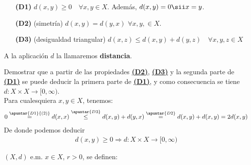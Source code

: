 \begin{ejemplo}
    \begin{enumerate}
        \item [\textbf{(\hypertarget{D1}{D1})}] $d(x, y) \geq 0$\ \ $\forall x,y \in X$. Además, $d(x,y)= 0 \sii x=y$.
        \item [\textbf{(\hypertarget{D2}{D2})}] (simetría) $d(x,y)=d(y,x)$ $\forall x, y, \in X.$
        \item [\textbf{(\hypertarget{D3}{D3})}] (desigualdad triangular) $d(x,z) \leq d(x,y) + d(y,z)$\ \ $\forall x,y,z \in X$
    \end{enumerate}

    A la aplicación $d$ la llamaremos \textbf{distancia}.

    \begin{ejercicio}
        Demostrar que a partir de las propiedades \hyperlink{D2}{\textbf{(D2)}}, \hyperlink{D3}{\textbf{(D3)}} y la segunda parte de \hyperlink{D1}{\textbf{(D1)}} se puede deducir la primera parte de \hyperlink{D1}{\textbf{(D1)}}, y como consecuencia se tiene $d:X \times X \rightarrow [0, \infty)$.\\

        Para cualesquiera $x,y \in X$, tenemos:
        \begin{gather*}
            0 \overset{\apuntar{D1}{(2)}}{=} d(x,x) \overset{\apuntar{D3}}{\leq} d(x,y) + d(y,x) \overset{\apuntar{D2}}{=} d(x,y) + d(x,y) = 2 d(x,y)
        \end{gather*}
        De donde podemos deducir
        \begin{gather*}
            d(x,y) \geq 0 \Rightarrow d:X \times X \rightarrow [0, \infty)
        \end{gather*}

        \endsquare
         
    \end{ejercicio}

   \begin{definicion}
        $(X,d)$ e.m. $x \in X$, $r >0$, se definen:


\end{definicion}
\end{ejemplo}
